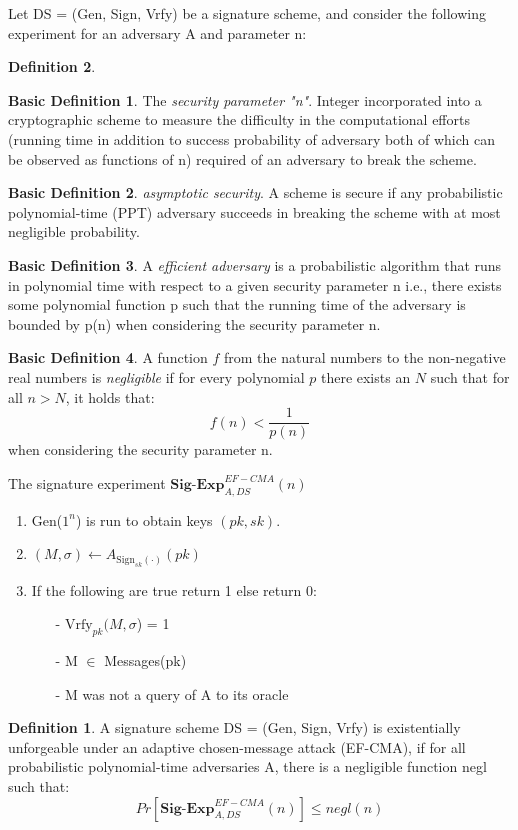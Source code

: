 \documentclass[]{final_report}
\theoremstyle{definition}
\newtheorem{definition}{Definition}[chapter]
\newtheorem{basic}{Basic Definition}
\begin{document}
Let DS = (Gen, Sign, Vrfy) be a signature scheme, and consider the following experiment for an adversary A and parameter n:
\begin{definition}
\label{def:EF-CMA}

\begin{basic}
The \textit{security parameter "n"}. Integer incorporated into a cryptographic scheme to measure the difficulty in the computational efforts (running time in addition to success probability of adversary both of which can be observed as functions of n) required of an adversary to break the scheme.
\end{basic}

\begin{basic}
\textit{asymptotic security}. A scheme is secure if any probabilistic polynomial-time (PPT) adversary succeeds in breaking the scheme with at most negligible probability.
\end{basic}

\begin{basic}
A \textit{efficient adversary} is a probabilistic algorithm that runs in polynomial time with respect to a given security parameter n i.e., there exists some polynomial function p such that the running time of the adversary is bounded by p(n) when considering the security parameter n.
\end{basic}
\begin{basic}
A function \( f \) from the natural numbers to the non-negative real numbers is \textit{negligible} if for every polynomial \( p \) there exists an \( N \) such that for all \( n > N \), it holds that:
\[ f(n) < \frac{1}{p(n)} \] when considering the security parameter n.
\end{basic}



The signature experiment $\textbf{Sig-Exp}_{A,DS}^{EF-CMA}(n)$
\begin{enumerate}
    \item Gen($1^n$) is run to obtain keys $(pk, sk)$.
    \item \((M, \sigma) \leftarrow A_{\text{Sign}_{sk}(\cdot)}(pk)\)
    \item If the following are true return 1 else return 0: 
    \begin{itemize}
    \item [-] $\text{Vrfy}_{pk} (M, \sigma$) = 1
    \item [-] M $\in$ Messages(pk)
    \item [-] M was not a query of A to its oracle
   \end{itemize}
\end{enumerate}

\begin{definition}
A signature scheme DS = (Gen, Sign, Vrfy) is existentially unforgeable under an adaptive chosen-message attack (EF-CMA), if for all probabilistic polynomial-time adversaries A, there is a negligible function negl such that:
\[ Pr[\textbf{Sig-Exp}_{A,DS}^{EF-CMA}(n)] \leq negl(n) \]

\end{definition}

\end{definition}
\end{document}
